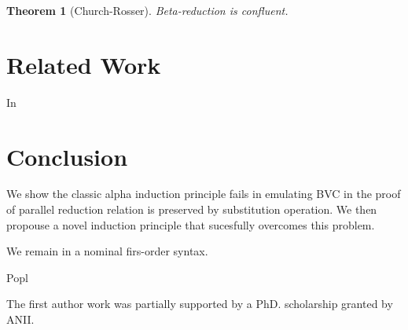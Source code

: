 \documentclass[preprint,10pt]{sigplanconf}
\newtheorem{theo}{Theorem}
\begin{document}
\begin{theo}[Church-Rosser]
Beta-reduction is confluent.
\end{theo}



\section{Related Work}

In~\cite{..} 

\section{Conclusion}

We show the classic alpha induction principle fails in emulating BVC in the proof of parallel reduction relation is preserved by substitution operation. We then propouse a novel induction principle that sucesfully overcomes this problem. 

We remain in a nominal firs-order syntax.

Popl





\acks

The first author work was partially supported by a PhD. scholarship granted by ANII.









\end{document}
